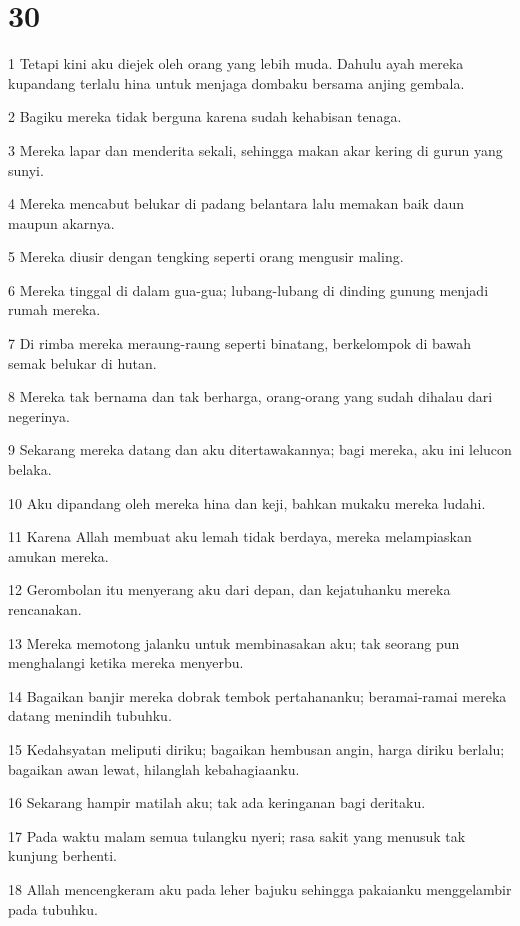 \chapter{30}

\par 1 Tetapi kini aku diejek oleh orang yang lebih muda. Dahulu ayah mereka kupandang terlalu hina untuk menjaga dombaku bersama anjing gembala.
\par 2 Bagiku mereka tidak berguna karena sudah kehabisan tenaga.
\par 3 Mereka lapar dan menderita sekali, sehingga makan akar kering di gurun yang sunyi.
\par 4 Mereka mencabut belukar di padang belantara lalu memakan baik daun maupun akarnya.
\par 5 Mereka diusir dengan tengking seperti orang mengusir maling.
\par 6 Mereka tinggal di dalam gua-gua; lubang-lubang di dinding gunung menjadi rumah mereka.
\par 7 Di rimba mereka meraung-raung seperti binatang, berkelompok di bawah semak belukar di hutan.
\par 8 Mereka tak bernama dan tak berharga, orang-orang yang sudah dihalau dari negerinya.
\par 9 Sekarang mereka datang dan aku ditertawakannya; bagi mereka, aku ini lelucon belaka.
\par 10 Aku dipandang oleh mereka hina dan keji, bahkan mukaku mereka ludahi.
\par 11 Karena Allah membuat aku lemah tidak berdaya, mereka melampiaskan amukan mereka.
\par 12 Gerombolan itu menyerang aku dari depan, dan kejatuhanku mereka rencanakan.
\par 13 Mereka memotong jalanku untuk membinasakan aku; tak seorang pun menghalangi ketika mereka menyerbu.
\par 14 Bagaikan banjir mereka dobrak tembok pertahananku; beramai-ramai mereka datang menindih tubuhku.
\par 15 Kedahsyatan meliputi diriku; bagaikan hembusan angin, harga diriku berlalu; bagaikan awan lewat, hilanglah kebahagiaanku.
\par 16 Sekarang hampir matilah aku; tak ada keringanan bagi deritaku.
\par 17 Pada waktu malam semua tulangku nyeri; rasa sakit yang menusuk tak kunjung berhenti.
\par 18 Allah mencengkeram aku pada leher bajuku sehingga pakaianku menggelambir pada tubuhku.
